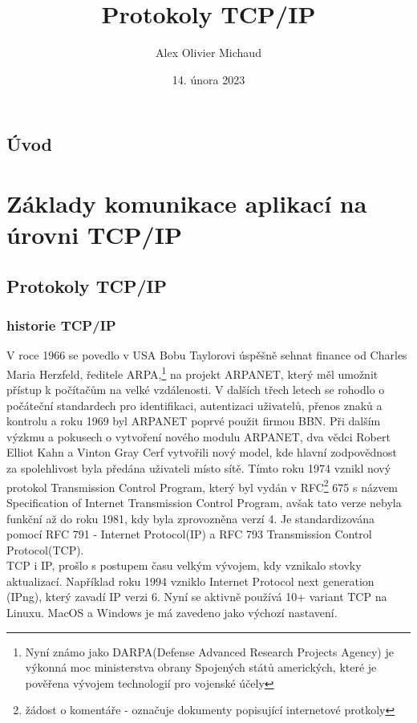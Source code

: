 \documentclass[12pt]{report}			%
\author{Alex Olivier Michaud}
\title{Protokoly TCP/IP}
\date{14. února 2023}
\begin{document}
	\mytitlepage						%
	
	
	\abstrakt{
		\lipsum[1]						%
	}{
		\lipsum[1]						%
	}
	
	\podekovani{
		\lipsum[2]						%
	}
	
   {\tableofcontents\newpage}			%
	
\addtocounter{page}{1}		%
	\chapter*{Úvod}
	
		\lipsum[1]	
	
	
	\part{Základy komunikace aplikací na úrovni TCP/IP}
	
		\chapter{Protokoly TCP/IP}
			
			\section{historie TCP/IP}
				V roce 1966 se povedlo v USA Bobu Taylorovi úspěšně sehnat finance od Charles Maria Herzfeld, ředitele ARPA,\footnote{Nyní známo jako DARPA(Defense Advanced Research Projects Agency) je výkonná moc ministerstva obrany Spojených států amerických, které je pověřena vývojem technologií pro vojenské účely} na projekt ARPANET, který měl umožnit přístup k počítačům na velké vzdálenosti. V dalších třech letech se rohodlo o počáteční standardech pro identifikaci, autentizaci uživatelů, přenos znaků a kontrolu a roku 1969 byl ARPANET poprvé použit firmou BBN. 
Při dalším výzkmu a pokusech o vytvoření nového modulu ARPANET, dva vědci Robert Elliot Kahn a Vinton Gray Cerf vytvořili nový model, kde hlavní zodpovědnost za spolehlivost byla předána uživateli místo sítě. Tímto roku 1974 vznikl nový protokol Transmission Control Program, který byl vydán v RFC\footnote{žádost o komentáře - označuje dokumenty popisující internetové protkoly} 675 s názvem Specification of Internet Transmission Control Program, avšak tato verze nebyla funkční až do roku 1981, kdy byla zprovozněna verzí 4. Je standardizována pomocí RFC 791 - Internet Protocol(IP) a RFC 793 Transmission Control Protocol(TCP). 
\\
TCP i IP, prošlo s postupem času velkým vývojem, kdy vznikalo stovky aktualizací. Například roku 1994 vzniklo Internet Protocol next generation (IPng), který zavadí IP verzi 6. Nyní se aktivně používá 10+ variant TCP na Linuxu. MacOS a Windows je má zavedeno jako výchozí nastavení. 
\end{document}

